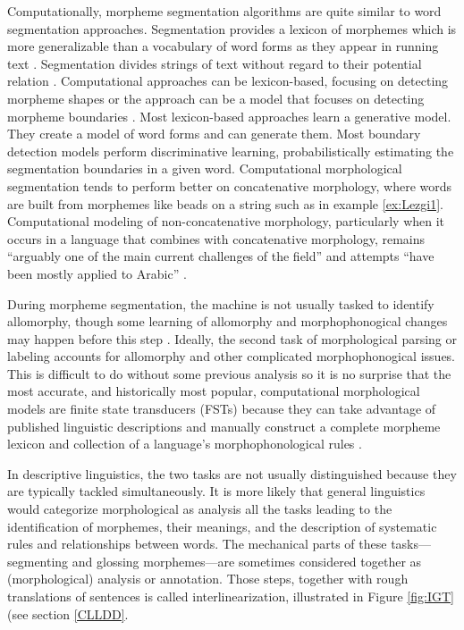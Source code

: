 \documentclass[12pt]{article}
\begin{document}
Computationally, morpheme segmentation algorithms are quite similar to word segmentation approaches. Segmentation provides a lexicon of morphemes which is more generalizable than a vocabulary of word forms as they appear in running text \cite{creutz_unsupervised_2002}. Segmentation divides strings of text without regard to their potential relation \cite{virpioja_empirical_2011}. Computational approaches can be lexicon-based, focusing on detecting morpheme shapes or the approach can be a model that focuses on detecting morpheme boundaries \cite{goodman_generation_2013}. Most lexicon-based approaches learn a generative model. They create a model of word forms and can generate them. Most boundary detection models perform discriminative learning, probabilistically estimating the segmentation boundaries in a given word. Computational morphological segmentation tends to perform better on concatenative morphology, where words are built from morphemes like beads on a string such as in example \ref{ex:Lezgi1}. Computational modeling of non-concatenative morphology, particularly when it occurs in a language that combines with concatenative morphology, remains ``arguably one of the main current challenges of the field'' and attempts ``have been mostly applied to Arabic'' \cite{goldsmith_computational_2017}. 

During morpheme segmentation, the machine is not usually tasked to identify allomorphy, though some learning of allomorphy and morphophonogical changes may happen before this step \cite{goldsmith_computational_2017}. Ideally, the second task of morphological parsing or labeling accounts for allomorphy and other complicated morphophonogical issues. This is difficult to do without some previous analysis so it is no surprise that the most accurate, and historically most popular, computational morphological models are finite state transducers (FSTs) because they can take advantage of published linguistic descriptions and manually construct a complete morpheme lexicon and collection of a language's morphophonological rules \cite{beesley_finite-state_2003}. 

In descriptive linguistics, the two tasks are not usually distinguished because they are typically tackled simultaneously. It is more likely that general linguistics would categorize morphological as analysis all the tasks leading to the identification of morphemes, their meanings, and the description of systematic rules and relationships between words. The mechanical parts of these tasks---segmenting and glossing morphemes---are sometimes considered together as (morphological) analysis or annotation. Those steps, together with rough translations of sentences is called interlinearization, illustrated in Figure \ref{fig:IGT} (see section \ref{CLLDD}.
\end{document}
